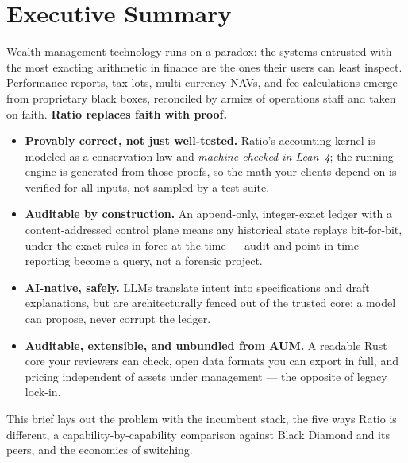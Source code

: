 \documentclass[11pt,letterpaper]{article}
\begin{document}
\section*{Executive Summary}
{\color{ratioRule}\titlerule[1.2pt]}
\vspace{6pt}

Wealth-management technology runs on a paradox: the systems entrusted with the
most exacting arithmetic in finance are the ones their users can least inspect.
Performance reports, tax lots, multi-currency NAVs, and fee calculations emerge
from proprietary black boxes, reconciled by armies of operations staff and taken
on faith. \textbf{Ratio replaces faith with proof.}

\begin{itemize}
  \item \textbf{Provably correct, not just well-tested.} Ratio's accounting
  kernel is modeled as a conservation law and \emph{machine-checked in Lean~4};
  the running engine is generated from those proofs, so the math your clients
  depend on is verified for all inputs, not sampled by a test suite.
  \item \textbf{Auditable by construction.} An append-only, integer-exact ledger
  with a content-addressed control plane means any historical state replays
  bit-for-bit, under the exact rules in force at the time --- audit and
  point-in-time reporting become a query, not a forensic project.
  \item \textbf{AI-native, safely.} LLMs translate intent into specifications and
  draft explanations, but are architecturally fenced out of the trusted core:
  a model can propose, never corrupt the ledger.
  \item \textbf{Auditable, extensible, and unbundled from AUM.} A readable Rust
  core your reviewers can check, open data formats you can export in full, and
  pricing independent of assets under management --- the opposite of legacy
  lock-in.
\end{itemize}

\vspace{4pt}


\noindent This brief lays out the problem with the incumbent stack, the five ways
Ratio is different, a capability-by-capability comparison against Black Diamond
and its peers, and the economics of switching.









\end{document}
